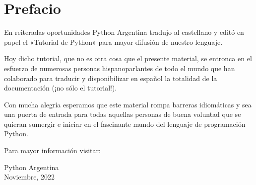 \newpage
\chapter*{Prefacio}

\sphinxAtStartPar
En reiteradas oportunidades Python Argentina
tradujo al castellano y editó en papel el «Tutorial de
Python» para mayor difusión de nuestro lenguaje.

\sphinxAtStartPar
Hoy dicho tutorial, que no es otra cosa que el
presente material, se entronca en el esfuerzo de
numerosas personas hispanoparlantes de todo el
mundo que han colaborado para traducir y
disponibilizar en español la totalidad de la
documentación (¡no sólo el tutorial!).

\sphinxAtStartPar
Con mucha alegría esperamos que este material
rompa barreras idiomáticas y sea una puerta de
entrada para todas aquellas personas de buena
voluntad que se quieran sumergir e iniciar en el
fascinante mundo del lenguaje de programación
Python.

\sphinxAtStartPar
Para mayor información visitar:

\hfill Python Argentina\\
\hfill Noviembre, 2022
